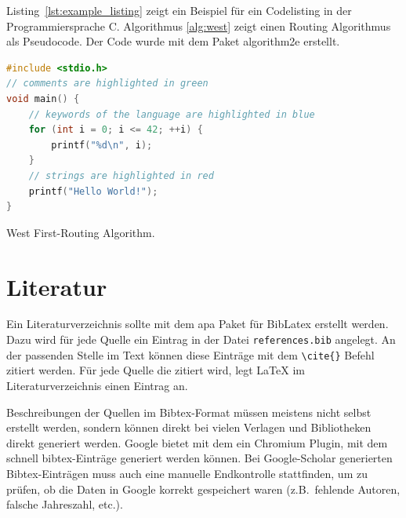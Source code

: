 Listing~\ref{lst:example_listing} zeigt ein Beispiel für ein Codelisting in der Programmiersprache C. Algorithmus \ref{alg:west} zeigt einen Routing Algorithmus als Pseudocode. Der Code wurde mit dem Paket algorithm2e \cite{algorithm2e} erstellt.

\begin{lstlisting}[language=C, caption=Beispiel für ein Codelisting in der Sprache C., label=lst:example_listing]
#include <stdio.h>
// comments are highlighted in green
void main() {
    // keywords of the language are highlighted in blue
    for (int i = 0; i <= 42; ++i) {
        printf("%d\n", i);
    }
    // strings are highlighted in red
    printf("Hello World!");
}
\end{lstlisting}

\begin{algorithm}[ht]

 \caption{West First-Routing Algorithm.}
 \label{alg:west}
\end{algorithm}

\section{Literatur}
Ein Literaturverzeichnis sollte mit dem apa Paket für BibLatex erstellt werden. Dazu wird für jede Quelle ein Eintrag in der Datei \texttt{references.bib} angelegt. An der passenden Stelle im Text können diese Einträge mit dem \texttt{\textbackslash cite\{\}} Befehl zitiert werden. Für jede Quelle die zitiert wird, legt \LaTeX{}  im Literaturverzeichnis einen Eintrag an.

Beschreibungen der Quellen im Bibtex-Format müssen meistens nicht selbst erstellt werden, sondern können direkt bei vielen Verlagen und Bibliotheken direkt generiert werden. Google bietet mit dem  ein Chromium Plugin, mit dem schnell bibtex-Einträge generiert werden können. Bei Google-Scholar generierten Bibtex-Einträgen muss auch eine manuelle Endkontrolle stattfinden, um zu prüfen, ob die Daten in Google korrekt gespeichert waren (z.B.~fehlende Autoren, falsche Jahreszahl, etc.).


